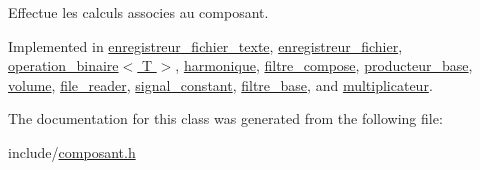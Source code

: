 Effectue les calculs associes au composant. 



Implemented in \hyperlink{classenregistreur__fichier__texte_a3c693001317b5940f3b61033c02fb2d7}{enregistreur\-\_\-fichier\-\_\-texte}, \hyperlink{classenregistreur__fichier_a3f123c156b96a9eec82bdec24962d597}{enregistreur\-\_\-fichier}, \hyperlink{classoperation__binaire_a2ecfa3c6c05006c5c1bc285281bc6f3a}{operation\-\_\-binaire$<$ T $>$}, \hyperlink{classharmonique_a4dbd729dfa443204d9834effbb63d816}{harmonique}, \hyperlink{classfiltre__compose_a6fd1598c04300da43989af4f87a37aba}{filtre\-\_\-compose}, \hyperlink{classproducteur__base_af1e171c9e69b0998d5124c7389737f82}{producteur\-\_\-base}, \hyperlink{classvolume_aab5a1f0490ea8b5826db6edd78e90f1d}{volume}, \hyperlink{classfile__reader_ac63890e9fbb85cda005efbce47f83648}{file\-\_\-reader}, \hyperlink{classsignal__constant_a18edd9db48afa7b287ae363bdcd91d43}{signal\-\_\-constant}, \hyperlink{classfiltre__base_ad06f5db1f851e5ad8655c9d8927cf347}{filtre\-\_\-base}, and \hyperlink{classmultiplicateur_ab22f15668247a10a35f027bd503f2442}{multiplicateur}.



The documentation for this class was generated from the following file\-:\begin{DoxyCompactItemize}
\item 
include/\hyperlink{composant_8h}{composant.\-h}\end{DoxyCompactItemize}
